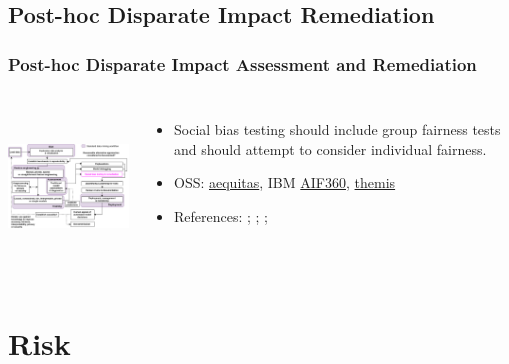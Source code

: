 \documentclass[11pt,
               aspectratio=169,
               hyperref={colorlinks}
               ]{beamer}
\begin{document}
		\subsection{Post-hoc Disparate Impact Remediation}
		
		\begin{frame}		
		
			\frametitle{Post-hoc Disparate Impact Assessment and Remediation}		
			
			\begin{columns}
	
				\centering
				\includegraphics[height=120pt]{../img/fair.png}
				
				\vspace{-5pt}
				\begin{itemize}
					\item Social bias testing should include group fairness tests and should attempt to consider individual fairness. 
					\item OSS: \href{https://github.com/dssg/aequitas}{aequitas}, IBM \href{https://github.com/IBM/AIF360}{AIF360}, \href{https://github.com/LASER-UMASS/Themis}{themis}
					\item References: ; ; ;  
				\end{itemize}
				
			\end{columns}
		
		\end{frame}
		
	\section{Risk}
\end{document}
